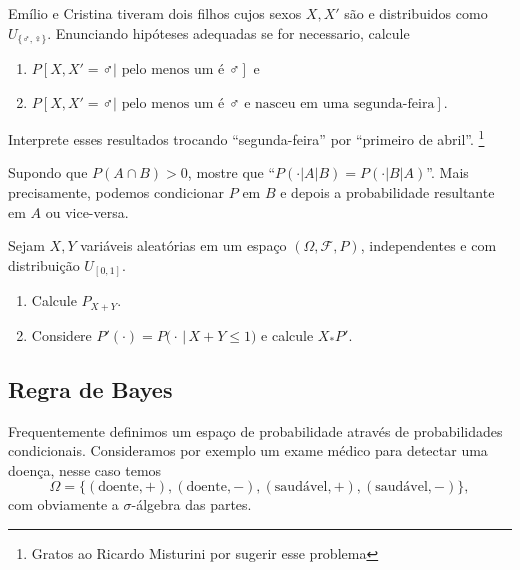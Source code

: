\begin{exercise}
  Emílio e Cristina tiveram dois filhos cujos sexos $X, X'$ são \iid e distribuidos como $U_{\{\male, \female\}}$.
Enunciando hipóteses adequadas se for necessario,  calcule
  \begin{enumerate}[\quad a)]
  \item $P[X, X' = \male | \text{ pelo menos um é $\male$}]$ e
  \item $P[X, X' = \male | \text{ pelo menos um é $\male$ e nasceu em uma segunda-feira}]$.
  \end{enumerate}
  Interprete esses resultados trocando ``segunda-feira'' por ``primeiro de abril''.
  \footnote{Gratos ao Ricardo Misturini por sugerir esse problema}
\end{exercise}

\begin{exercise}
  Supondo que $P(A \cap B) > 0$, mostre que ``$P(\cdot|A|B) = P(\cdot|B|A)$''.
  Mais precisamente, podemos condicionar $P$ em $B$ e depois a probabilidade resultante em $A$ ou vice-versa.
\end{exercise}

\begin{exercise}
  Sejam $X, Y$ vari\'aveis aleat\'orias em um espaço $(\Omega, \mathcal{F}, P)$, independentes e com distribuição $U_{[0,1]}$.
  \begin{enumerate}[\quad a)]
  \item Calcule $ P_{X+Y}$.
  \item Considere $P'(\cdot) = P\big(\cdot \, | \, X + Y \leq 1 \big)$ e calcule $X_* P'$.
  \end{enumerate}
\end{exercise}


\subsection{Regra de Bayes}

Frequentemente definimos um espaço de probabilidade através de probabilidades condicionais.
Consideramos por exemplo um exame médico para detectar uma doença, nesse caso temos
\begin{equation}
  \Omega = \{(\text{doente}, +), (\text{doente}, -), (\text{saudável}, +), (\text{saudável}, -)\},
\end{equation}
com obviamente a $\sigma$-álgebra das partes.

